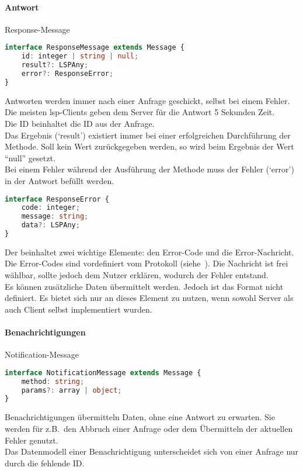 \documentclass[./einleitung.tex]{subfiles}
\begin{document}
    \paragraph{Antwort}{\footnotesize Response-Message}\\
    \begin{lstlisting}[language=Typescript]
interface ResponseMessage extends Message {
	id: integer | string | null;
	result?: LSPAny;
	error?: ResponseError;
}
    \end{lstlisting}
    Antworten werden immer nach einer Anfrage geschickt, selbst bei einem Fehler.\\
    Die meisten \acrshort{lsp}-Clients geben dem Server für die Antwort 5 Sekunden Zeit.\\
    Die ID beinhaltet die ID aus der Anfrage.\\
    Das Ergebnis (`result') existiert immer bei einer erfolgreichen Durchführung der Methode.
    Soll kein Wert zurückgegeben werden, so wird beim Ergebnis der Wert ``null'' gesetzt.\\
    Bei einem Fehler während der Ausführung der Methode muss der Fehler (`error') in der Antwort befüllt werden.
    \begin{lstlisting}[language=Typescript]
interface ResponseError {
	code: integer;
	message: string;
	data?: LSPAny;
}
    \end{lstlisting}
    Der beinhaltet zwei wichtige Elemente: den Error-Code und die Error-Nachricht.
    Die Error-Codes sind vordefiniert vom Protokoll (siehe~\cite{response}).
    Die Nachricht ist frei wählbar, sollte jedoch dem Nutzer erklären, wodurch der Fehler entstand.\\
    Es können zusätzliche Daten übermittelt werden.
    Jedoch ist das Format nicht definiert.
    Es bietet sich nur an dieses Element zu nutzen, wenn sowohl Server als auch Client selbst implementiert wurden.

    \paragraph{Benachrichtigungen}{\footnotesize Notification-Message}\\
\begin{lstlisting}[language=Typescript]
interface NotificationMessage extends Message {
	method: string;
	params?: array | object;
}
\end{lstlisting}
    Benachrichtigungen übermitteln Daten, ohne eine Antwort zu erwarten.
    Sie werden für z.B.\ den Abbruch einer Anfrage oder dem Übermitteln der aktuellen Fehler genutzt.\\
    Das Datenmodell einer Benachrichtigung unterscheidet sich von einer Anfrage nur durch die fehlende ID.
\end{document}
